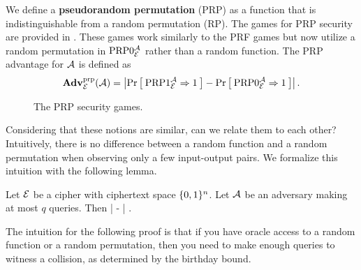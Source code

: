 We define a \textbf{pseudorandom permutation} (PRP) as a function that is indistinguishable from a random permutation (RP). The games for PRP security are provided in . These games work similarly to the PRF games but now utilize a random permutation in $\textnormal{PRP}0_{\cal E}^{\mathcal A}$ rather than a random function. The PRP advantage for ${\mathcal A}$ is defined as 
\begin{equation*}
\mathbf{Adv}^{\mathrm{prp}}_{{\cal E}}({\mathcal A}) = \left| \Pr\left[\: \textnormal{PRP}1_{\cal E}^{\mathcal A}\Rightarrow 1 \:\right] 
- \Pr\left[\: \textnormal{PRP}0_{\cal E}^{\mathcal A}\Rightarrow1 \:\right] \right|.
\end{equation*}

\begin{figure}
	\centering
\caption{The PRP security games.}
\label{fig:prp}	
\end{figure}

Considering that these notions are similar, can we relate them to each other? Intuitively, there is no difference between a random function and a random permutation when observing only a few input-output pairs. We formalize this intuition with the following lemma. 

\begin{lem}
	\label{switching-lem}
	Let ${\cal E}$ be a cipher with ciphertext space $\{0,1\}^n$. 
	Let ${\mathcal A}$ be an adversary making at most $q$ queries. Then
	\bnm
	\left|  
	-  \right| \le {}  \;.
	\enm
\end{lem}

The intuition for the following proof is that if you have oracle access to a random function or a random permutation, then you need to make enough queries to witness a collision, as determined by the birthday bound. 

